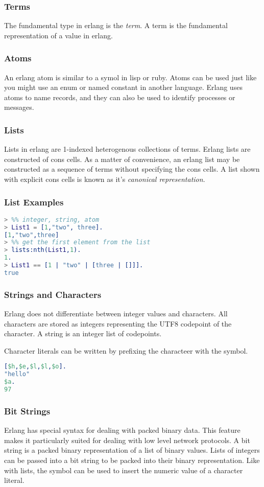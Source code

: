 \documentclass{beamer}
\begin{document}
\begin{frame}
  \frametitle{Terms}
  The fundamental type in erlang is the \emph{term}.  A term is the
  fundamental representation of a value in erlang.
\end{frame}

\begin{frame}
  \frametitle{Atoms}
  An erlang atom is similar to a symol in lisp or ruby.  Atoms can be
  used just like you might use an enum or named constant in another
  language.  Erlang uses atoms to name records, and they can also be
  used to identify processes or messages.
\end{frame}

\begin{frame}
  \frametitle{Lists}
  Lists in erlang are 1-indexed heterogenous collections of terms.
  Erlang lists are constructed of cons cells.  As a matter of
  convenience, an erlang list may be constructed as a sequence of
  terms without specifying the cons cells.  A list shown with explicit
  cons cells is known as it's \emph{canonical representation}.
\end{frame}

\begin{frame}[fragile]
  \frametitle{List Examples}
\begin{lstlisting}[language=erlang]
> %% integer, string, atom
> List1 = [1,"two", three].
[1,"two",three]
> %% get the first element from the list
> lists:nth(List1,1).
1.
> List1 == [1 | "two" | [three | []]].
true
\end{lstlisting}
\end{frame}

\begin{frame}[fragile]
  \frametitle{Strings and Characters}
  Erlang does not differentiate between integer values and characters.
  All characters are stored as integers representing the UTF8
  codepoint of the character.  A string is an integer list of
  codepoints.

  Character literals can be written by prefixing the characteer with
  the \textdollar{} symbol.
\begin{lstlisting}[language=erlang]
[$h,$e,$l,$l,$o].
"hello"
$a.
97
\end{lstlisting}
\end{frame}

\begin{frame}
  \frametitle{Bit Strings}
  Erlang has special syntax for dealing with packed binary data.  This
  feature makes it particularly suited for dealing with low level
  network protocols.  A bit string is a packed binary representation
  of a list of binary values.  Lists of integers can be passed into a
  bit string to be packed into their binary representation.  Like with
  lists, the \textdollar{} symbol can be used to insert the numeric
  value of a character literal.
\end{frame}
\end{document}
